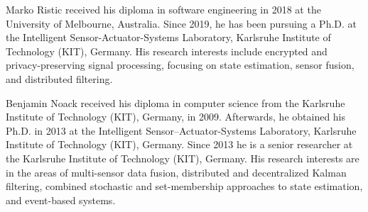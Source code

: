 \documentclass[10pt,letterpaper,oneside,twocolumn,journal]{IEEEtran}
\theoremstyle{definition}
\theoremstyle{definition}
\theoremstyle{remark}
\begin{document}
\ifCLASSOPTIONcaptionsoff
  \newpage
\fi





% 
%                                         
%                                         
%                                         
% 

\begin{IEEEbiography}{Marko Ristic}
received his diploma in software engineering in 2018 at the University of Melbourne, Australia. Since 2019, he has been pursuing a Ph.D. at the Intelligent Sensor-Actuator-Systems Laboratory, Karlsruhe Institute of Technology (KIT), Germany. His research interests include encrypted and privacy-preserving signal processing, focusing on state estimation, sensor fusion, and distributed filtering.
\end{IEEEbiography}

\begin{IEEEbiography}{Benjamin Noack}
received his diploma in computer science from the Karlsruhe Institute of Technology (KIT), Germany, in 2009. Afterwards, he obtained his Ph.D. in 2013 at the Intelligent Sensor–Actuator-Systems Laboratory, Karlsruhe Institute of Technology (KIT), Germany. Since 2013 he is a senior researcher at the Karlsruhe Institute of Technology (KIT), Germany. His research interests are in the areas of multi-sensor data fusion, distributed and decentralized Kalman filtering, combined stochastic and set-membership approaches to state estimation, and event-based systems.
\end{IEEEbiography}
\end{document}
